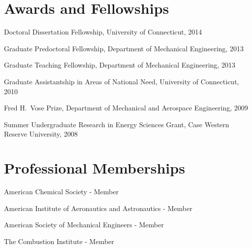 \begin{lonelist}
\end{lonelist}

\section{{\sectionfont Awards and Fellowships}}

Doctoral Dissertation Fellowship, University of Connecticut, 2014

Graduate Predoctoral Fellowship, Department of Mechanical
Engineering, 2013

Graduate Teaching Fellowship, Department of Mechanical Engineering, 2013

Graduate Assistantship in Areas of National
Need, University of Connecticut, 2010

Fred H.\ Vose Prize, Department of Mechanical and
Aerospace Engineering, 2009

Summer Undergraduate Research in Energy Sciences
Grant, Case Western Reserve University, 2008

\section{{\sectionfont Professional Memberships}}
American Chemical Society - Member

American Institute of Aeronautics and Astronautics - Member

American Society of Mechanical Engineers - Member

The Combustion Institute - Member



